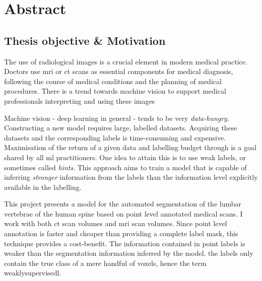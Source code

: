 \chapter*{Abstract}

\begin{multicols}{2}
\thispagestyle{plain}
\section*{Thesis objective \& Motivation}

\par{
    The use of radiological images is a crucial element in modern medical practice. 
    Doctors use \acrfull{mri} or \acrfull{ct} scans as essential components for medical diagnosis, following the course of medical conditions and the planning of medical procedures.
There is a trend towards machine vision to support medical professionals interpreting and using these images 
}
\par{
    Machine vision - deep learning in general - tends to be very \textit{data-hungry}. Constructing a new model requires large, labelled datasets.
    Acquiring these datasets and the corresponding labels is time-consuming and expensive. 
    Maximisation of the return of a given data and labelling budget through is a goal shared by all \acrshort{ml} practitioners.
    One idea to attain this is to use weak labels, or sometimes called \textit{hints}.
    This approach aims to train a model that is capable of inferring \textit{stronger} information from the labels than the information level explicitly available in the labelling.
}
\par{
    This project presents a model for the automated segmentation of the lumbar vertebrae of the human spine based on point level annotated medical scans.
    I work with both \acrshort{ct} scan volumes and \acrshort{mri} scan volumes.
    Since point level annotation is faster and cheaper than providing a complete label mask, this technique provides a cost-benefit. 
    The information contained in point labels is weaker than the segmentation information inferred by the model. the labels only contain the true class of a mere handful of voxels, hence the term \gls{weaklysupervisedl}. 
}




\end{multicols}
